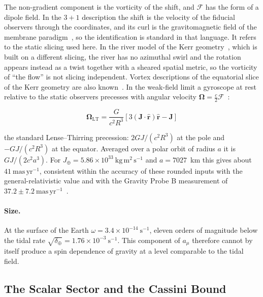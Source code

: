 \documentclass[anonymous]{iopjournal}
\begin{document}
The non-gradient component is the vorticity of the shift, and $\mathcal{F}$ has the form of a dipole field. In the $3+1$ description the shift is the velocity of the fiducial observers through the coordinates, and its curl is the gravitomagnetic field of the membrane paradigm~\cite{ThorneMembrane1986}, so the identification is standard in that language. It refers to the static slicing used here. In the river model of the Kerr geometry~\cite{HamiltonLisle2008}, which is built on a different slicing, the river has no azimuthal swirl and the rotation appears instead as a twist together with a sheared spatial metric, so the vorticity of ``the flow'' is not slicing independent. Vortex descriptions of the equatorial slice of the Kerr geometry are also known~\cite{VisserWeinfurtner2005}. In the weak-field limit a gyroscope at rest relative to the static observers precesses with angular velocity $\boldsymbol{\Omega}=\tfrac{c}{2}\mathcal{F}$~\cite{MTW1973}:

\begin{equation}\label{eq_gyro}
    \boldsymbol{\Omega}_{\mathrm{LT}}=\frac{G}{c^2R^3}\left[3(\mathbf{J}\cdot\hat{\mathbf{r}})\hat{\mathbf{r}}-\mathbf{J}\right]
\end{equation}

the standard Lense--Thirring precession: $2GJ/(c^2R^3)$ at the pole and $-GJ/(c^2R^3)$ at the equator. Averaged over a polar orbit of radius $a$ it is $GJ/(2c^2a^3)$. For $J_\oplus=5.86\times10^{33}~\mathrm{kg\,m^2\,s^{-1}}$ and $a=7027$~km this gives about $41~\mathrm{mas\,yr^{-1}}$, consistent within the accuracy of these rounded inputs with the general-relativistic value and with the Gravity Probe B measurement of $37.2\pm7.2~\mathrm{mas\,yr^{-1}}$~\cite{Everitt2011GPB}.

\paragraph{Size.} At the surface of the Earth $\omega=3.4\times10^{-14}~\mathrm{s^{-1}}$, eleven orders of magnitude below the tidal rate $\sqrt{\delta_\oplus}=1.76\times10^{-3}~\mathrm{s^{-1}}$. This component of $a_\mu$ therefore cannot by itself produce a spin dependence of gravity at a level comparable to the tidal field.

\subsection{The Scalar Sector and the Cassini Bound}
\end{document}
